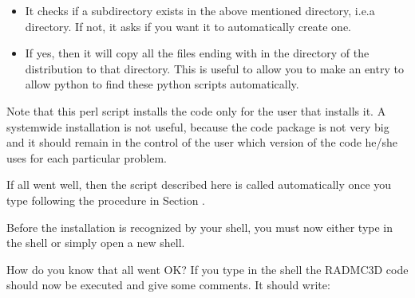 \documentclass[letterpaper,10pt,english]{sphinxmanual}
\begin{document}
\begin{itemize}
\item {} 
It checks if a  subdirectory exists in the above
mentioned  directory, i.e.a 
directory. If not, it asks if you want it to automatically create one.

\item {} 
If yes, then it will copy all the files ending with  in
the  directory of the distribution to that
 directory. This is useful to
allow you to make an  entry to allow python to find
these python scripts automatically.

\end{itemize}

Note that this perl script installs the code only for the user that installs
it. A system\sphinxhyphen{}wide installation is not useful, because the code package is not
very big and it should remain in the control of the user which version of the
code he/she uses for each particular problem.

If all went well, then the  script described here is
called automatically once you type  following the
procedure in Section {\hyperref[\detokenize{installation:sec-makeing}]{}}.

Before the installation is recognized by your shell, you must now either
type  in the shell or simply open a new shell.

How do you know that all went OK? If you type  in the
shell the RADMC\sphinxhyphen{}3D code should now be executed and give some comments. It
should write:
\end{document}
